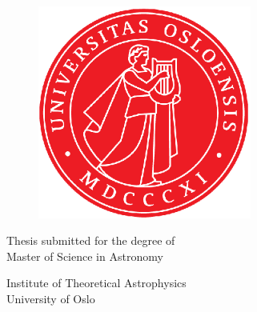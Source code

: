 \begin{titlepage}
\begin{center}

\bfseries
\LARGE
\@title

\large
\@author

\vspace{1cm}
\begin{figure}[h]
\centering
\includegraphics[width=7cm]{uiologo.eps}
\end{figure}

\Large
Thesis submitted for the degree of \\
Master of Science in Astronomy

\large
Institute of Theoretical Astrophysics\\
University of Oslo

\@date

\end{center}
\normalfont

\end{titlepage}

